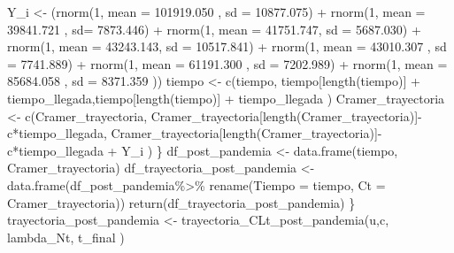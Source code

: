 \documentclass[
  us-letterpaper,
]{scrreprt}
\newenvironment{Shaded}{\begin{snugshade}}{\end{snugshade}}
\newcommand{\AttributeTok}[1]{\textcolor[rgb]{0.40,0.45,0.13}{#1}}
\newcommand{\DecValTok}[1]{\textcolor[rgb]{0.68,0.00,0.00}{#1}}
\newcommand{\FloatTok}[1]{\textcolor[rgb]{0.68,0.00,0.00}{#1}}
\newcommand{\FunctionTok}[1]{\textcolor[rgb]{0.28,0.35,0.67}{#1}}
\newcommand{\NormalTok}[1]{\textcolor[rgb]{0.00,0.23,0.31}{#1}}
\newcommand{\OtherTok}[1]{\textcolor[rgb]{0.00,0.23,0.31}{#1}}
\newcommand{\SpecialCharTok}[1]{\textcolor[rgb]{0.37,0.37,0.37}{#1}}
\theoremstyle{plain}
\theoremstyle{plain}
\theoremstyle{definition}
\theoremstyle{remark}
\begin{document}
\begin{Shaded}
\begin{Highlighting}[]
\NormalTok{    Y\_i }\OtherTok{\textless{}{-}}\NormalTok{  (}\FunctionTok{rnorm}\NormalTok{(}\DecValTok{1}\NormalTok{, }\AttributeTok{mean =} \FloatTok{101919.050}\NormalTok{ , }\AttributeTok{sd =} \FloatTok{10877.075}\NormalTok{) }\SpecialCharTok{+} 
            \FunctionTok{rnorm}\NormalTok{(}\DecValTok{1}\NormalTok{, }\AttributeTok{mean =}  \FloatTok{39841.721}\NormalTok{ , }\AttributeTok{sd=} \FloatTok{7873.446}\NormalTok{) }\SpecialCharTok{+}  
            \FunctionTok{rnorm}\NormalTok{(}\DecValTok{1}\NormalTok{, }\AttributeTok{mean =}   \FloatTok{41751.747}\NormalTok{, }\AttributeTok{sd =} \FloatTok{5687.030}\NormalTok{) }\SpecialCharTok{+} 
            \FunctionTok{rnorm}\NormalTok{(}\DecValTok{1}\NormalTok{, }\AttributeTok{mean =}   \FloatTok{43243.143}\NormalTok{, }\AttributeTok{sd =} \FloatTok{10517.841}\NormalTok{) }\SpecialCharTok{+} 
            \FunctionTok{rnorm}\NormalTok{(}\DecValTok{1}\NormalTok{, }\AttributeTok{mean =} \FloatTok{43010.307}\NormalTok{  , }\AttributeTok{sd =} \FloatTok{7741.889}\NormalTok{) }\SpecialCharTok{+} 
            \FunctionTok{rnorm}\NormalTok{(}\DecValTok{1}\NormalTok{, }\AttributeTok{mean =} \FloatTok{61191.300}\NormalTok{  , }\AttributeTok{sd =} \FloatTok{7202.989}\NormalTok{) }\SpecialCharTok{+} 
            \FunctionTok{rnorm}\NormalTok{(}\DecValTok{1}\NormalTok{, }\AttributeTok{mean =}  \FloatTok{85684.058}\NormalTok{ , }\AttributeTok{sd =} \FloatTok{8371.359}\NormalTok{ )) }
\NormalTok{    tiempo }\OtherTok{\textless{}{-}} \FunctionTok{c}\NormalTok{(tiempo, tiempo[}\FunctionTok{length}\NormalTok{(tiempo)] }\SpecialCharTok{+} 
\NormalTok{                tiempo\_llegada,tiempo[}\FunctionTok{length}\NormalTok{(tiempo)] }\SpecialCharTok{+} 
\NormalTok{                tiempo\_llegada ) }
\NormalTok{    Cramer\_trayectoria }\OtherTok{\textless{}{-}} \FunctionTok{c}\NormalTok{(Cramer\_trayectoria,}
\NormalTok{                    Cramer\_trayectoria[}\FunctionTok{length}\NormalTok{(Cramer\_trayectoria)]}\SpecialCharTok{{-}}
\NormalTok{                          c}\SpecialCharTok{*}\NormalTok{tiempo\_llegada, }
\NormalTok{                    Cramer\_trayectoria[}\FunctionTok{length}\NormalTok{(Cramer\_trayectoria)]}\SpecialCharTok{{-}} 
\NormalTok{                            c}\SpecialCharTok{*}\NormalTok{tiempo\_llegada }\SpecialCharTok{+}\NormalTok{ Y\_i )}
\NormalTok{  \}}
\NormalTok{  df\_post\_pandemia }\OtherTok{\textless{}{-}} \FunctionTok{data.frame}\NormalTok{(tiempo, Cramer\_trayectoria)}
\NormalTok{  df\_trayectoria\_post\_pandemia }\OtherTok{\textless{}{-}} \FunctionTok{data.frame}\NormalTok{(df\_post\_pandemia}\SpecialCharTok{\%\textgreater{}\%} 
                                          \FunctionTok{rename}\NormalTok{(}\AttributeTok{Tiempo =}\NormalTok{ tiempo, }
                                          \AttributeTok{Ct =}\NormalTok{ Cramer\_trayectoria))}
  \FunctionTok{return}\NormalTok{(df\_trayectoria\_post\_pandemia)}
\NormalTok{\}}
\NormalTok{trayectoria\_post\_pandemia }\OtherTok{\textless{}{-}} \FunctionTok{trayectoria\_CLt\_post\_pandemia}\NormalTok{(u,c,}
\NormalTok{                                            lambda\_Nt, t\_final )}



\end{Highlighting}
\end{Shaded}
\end{document}
